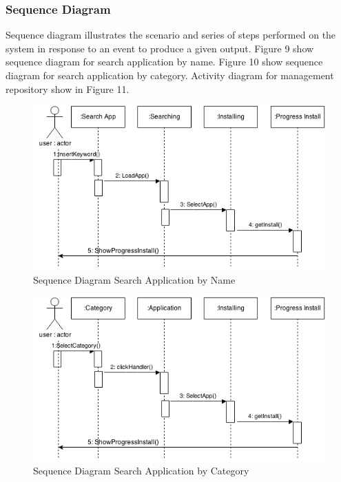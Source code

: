 \documentclass[conference, letterpaper]{IEEEtran}
\begin{document}
\subsubsection{Sequence Diagram}
Sequence diagram illustrates the scenario and series of steps performed on the system in response to an event to produce a given output. Figure 9 show sequence diagram for search application by name. Figure 10 show sequence diagram for search application by category. Activity diagram for management repository show in Figure 11.

\begin{figure}[!t]
\centering
\includegraphics[scale=0.4]{image/SearchbyName.png}
\caption{Sequence Diagram Search Application by Name}
\end{figure}

\begin{figure}[!t]
\centering
\includegraphics[scale=0.4]{image/SearchbyCategory.png}
\caption{Sequence Diagram Search Application by Category}
\end{figure}
\end{document}
